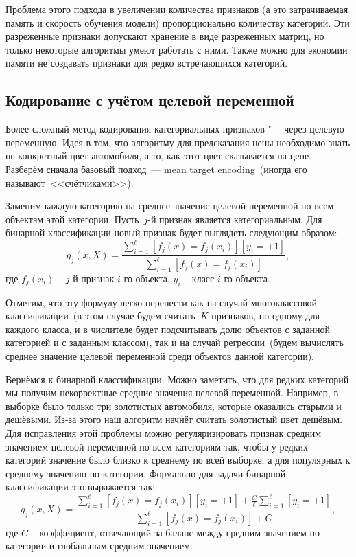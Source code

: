 \documentclass[12pt,fleqn]{article}
\begin{document}
Проблема этого подхода в увеличении количества признаков (а это затрачиваемая память и скорость обучения модели) пропорционально количеству категорий. Эти разреженные признаки допускают хранение в виде разреженных матриц, но только некоторые алгоритмы умеют работать с ними. Также можно для экономии памяти не создавать признаки для редко встречающихся категорий.

\subsection{Кодирование с учётом целевой переменной}

Более сложный метод кодирования категориальных признаков "--- через целевую переменную.
Идея в том, что алгоритму для предсказания цены необходимо знать не конкретный цвет автомобиля,
а то, как этот цвет сказывается на цене.
Разберём сначала базовый подход~--- mean target encoding~(иногда его называют~<<счётчиками>>).

Заменим каждую категорию на среднее значение целевой переменной по всем объектам этой категории.
Пусть~$j$-й признак является категориальным.
Для бинарной классификации новый признак будет выглядеть следующим образом:
\begin{equation}
\label{eq:meantarget}
    g_j(x, X)
    =
    \frac{
        \sum_{i=1}^{\ell}
            [f_j(x) = f_j(x_i)][y_i = +1]
    }{
        \sum_{i=1}^{\ell}
            [f_j(x) = f_j(x_i)]
    },
\end{equation}
где $f_j(x_i)$ -- $j$-й признак $i$-го объекта, $y_i$ -- класс $i$-го объекта.

Отметим, что эту формулу легко перенести как на случай многоклассовой классификации~(в этом случае
будем считать~$K$ признаков, по одному для каждого класса, и в числителе будет подсчитывать долю
объектов с заданной категорией и с заданным классом),
так и на случай регрессии~(будем вычислять среднее значение целевой переменной среди объектов данной категории).

Вернёмся к бинарной классификации.
Можно заметить, что для редких категорий мы получим некорректные средние значения целевой переменной.
Например, в выборке было только три золотистых автомобиля, которые оказались старыми и дешёвыми.
Из-за этого наш алгоритм начнёт считать золотистый цвет дешёвым.
Для исправления этой проблемы можно регуляризировать признак средним значением целевой переменной по всем категориям так,
чтобы у редких категорий значение было близко к среднему по всей выборке,
а для популярных к среднему значению по категории.
Формально для задачи бинарной классификации это выражается так:
\begin{equation}
\label{eq:meantarget-reg}
    g_j(x, X)
    =
    \frac{
        \sum_{i=1}^{\ell}
            [f_j(x) = f_j(x_i)][y_i = +1]
            +
            \frac{C}{\ell}
            \sum_{i=1}^{\ell}
            [y_i = +1]
    }{
        \sum_{i=1}^{\ell}
        [f_j(x) = f_j(x_i)] + C
    },
\end{equation}
где $C$ -- коэффициент, отвечающий за баланс между средним значением по категории и глобальным средним значением.
\end{document}
